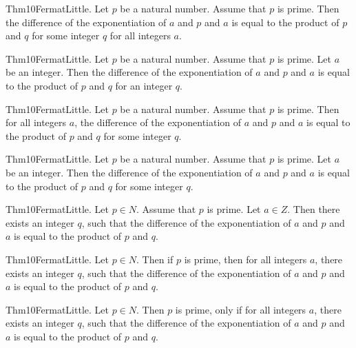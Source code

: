\documentclass{article}
\begin{document}
Thm10FermatLittle. Let $p$ be a natural number. Assume that $p$ is prime. Then the difference of the exponentiation of $a$ and $p$ and $a$ is equal to the product of $p$ and $q$ for some integer $q$ for all integers $a$.

Thm10FermatLittle. Let $p$ be a natural number. Assume that $p$ is prime. Let $a$ be an integer. Then the difference of the exponentiation of $a$ and $p$ and $a$ is equal to the product of $p$ and $q$ for an integer $q$.

Thm10FermatLittle. Let $p$ be a natural number. Assume that $p$ is prime. Then for all integers $a$, the difference of the exponentiation of $a$ and $p$ and $a$ is equal to the product of $p$ and $q$ for some integer $q$.

Thm10FermatLittle. Let $p$ be a natural number. Assume that $p$ is prime. Let $a$ be an integer. Then the difference of the exponentiation of $a$ and $p$ and $a$ is equal to the product of $p$ and $q$ for some integer $q$.

Thm10FermatLittle. Let $p \in N$. Assume that $p$ is prime. Let $a \in Z$. Then there exists an integer $q$, such that the difference of the exponentiation of $a$ and $p$ and $a$ is equal to the product of $p$ and $q$.

Thm10FermatLittle. Let $p \in N$. Then if $p$ is prime, then for all integers $a$, there exists an integer $q$, such that the difference of the exponentiation of $a$ and $p$ and $a$ is equal to the product of $p$ and $q$.

Thm10FermatLittle. Let $p \in N$. Then $p$ is prime, only if for all integers $a$, there exists an integer $q$, such that the difference of the exponentiation of $a$ and $p$ and $a$ is equal to the product of $p$ and $q$.
\end{document}
